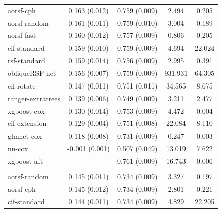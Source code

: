 \documentclass[12pt]{article}\usepackage[]{graphicx}\usepackage[]{xcolor}
\newenvironment{knitrout}{}{} %
\begin{document}
\begin{knitrout}
\begin{longtable}[t]{lcccc}
\hline
\hspace{1em}aorsf-cph & 0.163 (0.012) & 0.759 (0.009) & 2.494 & 0.205\\
\hspace{1em}aorsf-random & 0.161 (0.011) & 0.759 (0.010) & 3.004 & 0.189\\
\hspace{1em}aorsf-fast & 0.160 (0.012) & 0.757 (0.009) & 0.806 & 0.205\\
\hspace{1em}cif-standard & 0.159 (0.010) & 0.759 (0.009) & 4.694 & 22.024\\
\hspace{1em}rsf-standard & 0.159 (0.014) & 0.756 (0.009) & 2.995 & 0.391\\
\hspace{1em}obliqueRSF-net & 0.156 (0.007) & 0.759 (0.009) & 931.931 & 64.305\\
\hspace{1em}cif-rotate & 0.147 (0.011) & 0.751 (0.011) & 34.565 & 8.675\\
\hspace{1em}ranger-extratrees & 0.139 (0.006) & 0.749 (0.009) & 3.211 & 2.477\\
\hspace{1em}xgboost-cox & 0.130 (0.014) & 0.753 (0.009) & 4.472 & 0.004\\
\hspace{1em}cif-extension & 0.129 (0.004) & 0.751 (0.008) & 22.084 & 8.110\\
\hspace{1em}glmnet-cox & 0.118 (0.008) & 0.731 (0.009) & 0.247 & 0.003\\
\hspace{1em}nn-cox & -0.001 (0.001) & 0.507 (0.049) & 13.019 & 7.622\\
\hspace{1em}xgboost-aft & --- & 0.761 (0.009) & 16.743 & 0.006\\
\addlinespace[0.3em]
\multicolumn{5}{l}{\textit{\textbf{Rotterdam tumor bank; recurrence, n = 2982, p = 11}}}\\
\hline
\hspace{1em}aorsf-random & 0.145 (0.011) & 0.734 (0.009) & 3.327 & 0.197\\
\hspace{1em}aorsf-cph & 0.145 (0.012) & 0.734 (0.009) & 2.801 & 0.221\\
\hspace{1em}cif-standard & 0.144 (0.011) & 0.734 (0.009) & 4.829 & 22.205\\

\end{longtable}
\end{knitrout}
\end{document}
